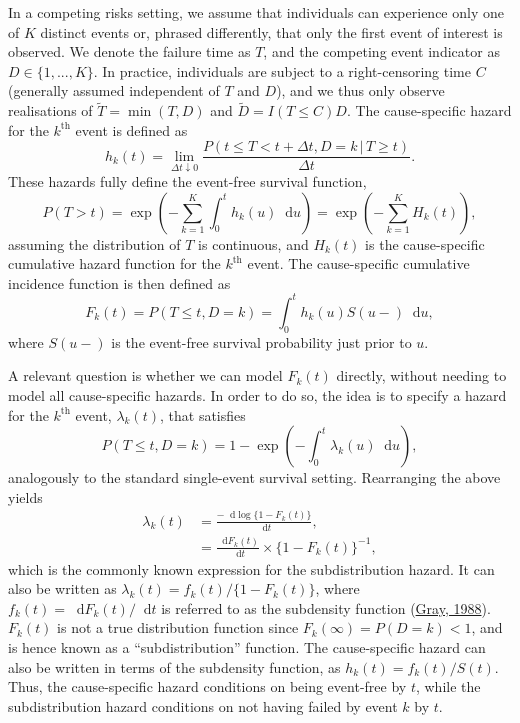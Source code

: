 \documentclass[
  letterpaper,
  DIV=11,
  numbers=noendperiod]{scrreprt}
\newcommand{\given}{\,|\,}
\newcommand\diff{\mathop{}\!\mathrm{d}}
\begin{document}
In a competing risks setting, we assume that individuals can experience
only one of \(K\) distinct events or, phrased differently, that only the
first event of interest is observed. We denote the failure time as
\(T\), and the competing event indicator as \(D \in \{1,...,K\}\). In
practice, individuals are subject to a right-censoring time \(C\)
(generally assumed independent of \(T\) and \(D\)), and we thus only
observe realisations of \(\tilde{T} = \min(T, D)\) and
\(\tilde{D} = I(T \leq C)D\). The cause-specific hazard for the
\(k^{\text{th}}\) event is defined as\\
\begin{equation*}
    h_k(t) = \lim_{\Delta t \downarrow 0} \frac{P(t \leq T < t + \Delta t, D = k \given T \geq t)}{\Delta t}.
\end{equation*} These hazards fully define the event-free survival
function, \begin{equation*}
    P(T > t) = \exp \left( - \sum_{k = 1}^{K} \int_{0}^{t} h_k(u)\diff u \right) = \exp \left( - \sum_{k = 1}^{K} H_k(t) \right),
\end{equation*} assuming the distribution of \(T\) is continuous, and
\(H_k(t)\) is the cause-specific cumulative hazard function for the
\(k^{\text{th}}\) event. The cause-specific cumulative incidence
function is then defined as \begin{equation*}
    F_k(t) = P(T \leq t, D = k) = \int_{0}^{t}h_k(u)S(u-)\diff u,
\end{equation*} where \(S(u-)\) is the event-free survival probability
just prior to \(u\).

A relevant question is whether we can model \(F_k(t)\) directly, without
needing to model all cause-specific hazards. In order to do so, the idea
is to specify a hazard for the \(k^{\text{th}}\) event,
\(\lambda_k(t)\), that satisfies \begin{equation*}
    P(T \leq t, D = k) = 1 - \exp\left(-\int_{0}^{t}\lambda_k(u)\diff u\right),
\end{equation*} analogously to the standard single-event survival
setting. Rearranging the above yields \begin{align*}
    \lambda_k(t) &= \frac{-\diff \log \{1 - F_k(t)\}}{\diff t}, \\
    &= \frac{\diff F_k(t)}{\diff t} \times \{1 - F_k(t)\}^{-1}, 
\end{align*} which is the commonly known expression for the
subdistribution hazard. It can also be written as
\(\lambda_k(t) = f_k(t)/\{1 - F_k(t)\}\), where
\(f_k(t) = \diff F_k(t)/\diff t\) is referred to as the subdensity
function (\protect\hyperlink{ref-grayClassKSampleTests1988}{Gray,
1988}). \(F_k(t)\) is not a true distribution function since
\(F_k(\infty)=P(D=k)<1\), and is hence known as a ``subdistribution''
function. The cause-specific hazard can also be written in terms of the
subdensity function, as \(h_k(t) = f_k(t)/S(t)\). Thus, the
cause-specific hazard conditions on being event-free by \(t\), while the
subdistribution hazard conditions on not having failed by event \(k\) by
\(t\).
\end{document}
